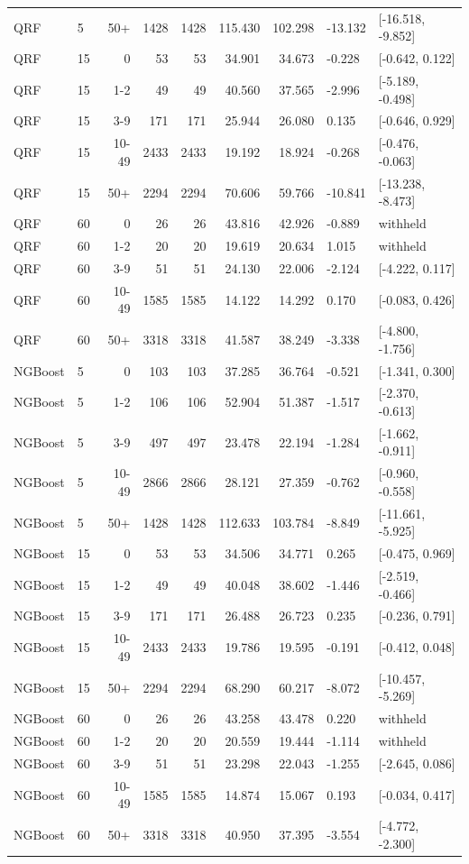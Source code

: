 \begin{longtable}{llrrrrrll}
QRF & 5 & 50+ & 1428 & 1428 & 115.430 & 102.298 & -13.132 & [-16.518, -9.852]\\
QRF & 15 & 0 & 53 & 53 & 34.901 & 34.673 & -0.228 & [-0.642, 0.122]\\
QRF & 15 & 1-2 & 49 & 49 & 40.560 & 37.565 & -2.996 & [-5.189, -0.498]\\
QRF & 15 & 3-9 & 171 & 171 & 25.944 & 26.080 & 0.135 & [-0.646, 0.929]\\
QRF & 15 & 10-49 & 2433 & 2433 & 19.192 & 18.924 & -0.268 & [-0.476, -0.063]\\
QRF & 15 & 50+ & 2294 & 2294 & 70.606 & 59.766 & -10.841 & [-13.238, -8.473]\\
QRF & 60 & 0 & 26 & 26 & 43.816 & 42.926 & -0.889 & withheld\\
QRF & 60 & 1-2 & 20 & 20 & 19.619 & 20.634 & 1.015 & withheld\\
QRF & 60 & 3-9 & 51 & 51 & 24.130 & 22.006 & -2.124 & [-4.222, 0.117]\\
QRF & 60 & 10-49 & 1585 & 1585 & 14.122 & 14.292 & 0.170 & [-0.083, 0.426]\\
QRF & 60 & 50+ & 3318 & 3318 & 41.587 & 38.249 & -3.338 & [-4.800, -1.756]\\
NGBoost & 5 & 0 & 103 & 103 & 37.285 & 36.764 & -0.521 & [-1.341, 0.300]\\
NGBoost & 5 & 1-2 & 106 & 106 & 52.904 & 51.387 & -1.517 & [-2.370, -0.613]\\
NGBoost & 5 & 3-9 & 497 & 497 & 23.478 & 22.194 & -1.284 & [-1.662, -0.911]\\
NGBoost & 5 & 10-49 & 2866 & 2866 & 28.121 & 27.359 & -0.762 & [-0.960, -0.558]\\
NGBoost & 5 & 50+ & 1428 & 1428 & 112.633 & 103.784 & -8.849 & [-11.661, -5.925]\\
NGBoost & 15 & 0 & 53 & 53 & 34.506 & 34.771 & 0.265 & [-0.475, 0.969]\\
NGBoost & 15 & 1-2 & 49 & 49 & 40.048 & 38.602 & -1.446 & [-2.519, -0.466]\\
NGBoost & 15 & 3-9 & 171 & 171 & 26.488 & 26.723 & 0.235 & [-0.236, 0.791]\\
NGBoost & 15 & 10-49 & 2433 & 2433 & 19.786 & 19.595 & -0.191 & [-0.412, 0.048]\\
NGBoost & 15 & 50+ & 2294 & 2294 & 68.290 & 60.217 & -8.072 & [-10.457, -5.269]\\
NGBoost & 60 & 0 & 26 & 26 & 43.258 & 43.478 & 0.220 & withheld\\
NGBoost & 60 & 1-2 & 20 & 20 & 20.559 & 19.444 & -1.114 & withheld\\
NGBoost & 60 & 3-9 & 51 & 51 & 23.298 & 22.043 & -1.255 & [-2.645, 0.086]\\
NGBoost & 60 & 10-49 & 1585 & 1585 & 14.874 & 15.067 & 0.193 & [-0.034, 0.417]\\
NGBoost & 60 & 50+ & 3318 & 3318 & 40.950 & 37.395 & -3.554 & [-4.772, -2.300]\\
\bottomrule\end{longtable}\normalsize

